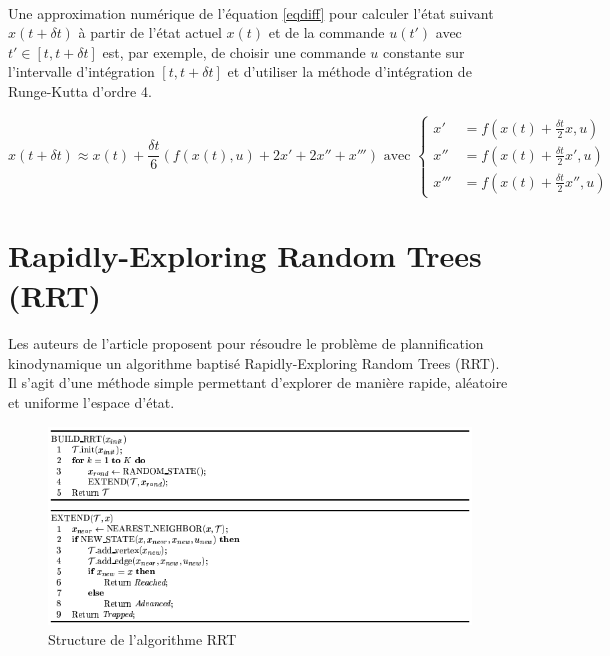 \documentclass[12pt]{article}
\begin{document}
\paragraph{}
Une approximation numérique de l'équation \eqref{eqdiff} pour calculer l'état suivant $x(t+\delta t)$ à partir de l'état actuel $x(t)$ et de la commande $u(t')$ avec $t' \in [t, t+\delta t]$ est, par exemple, de choisir une commande $u$ constante sur l'intervalle d'intégration $[t, t+\delta t]$ et d'utiliser la méthode d'intégration de Runge-Kutta d'ordre 4.

$$
x(t+\delta t) \approx x(t)+\frac{\delta t}{6}(f(x(t),u)+2x'+2x''+x''') \text{ avec } \left\{
\begin{matrix}
x' &= f(x(t)+\frac{\delta t}{2}x,u)\\
x'' &= f(x(t)+\frac{\delta t}{2}x',u)\\
x''' &= f(x(t)+\frac{\delta t}{2}x'',u)
\end{matrix}
\right.
$$


\section{Rapidly-Exploring Random Trees (RRT)}

\paragraph{}
Les auteurs de l'article proposent pour résoudre le problème de plannification kinodynamique un algorithme baptisé \og Rapidly-Exploring Random Trees \fg{} (RRT). Il s'agit d'une méthode simple permettant d'explorer de manière rapide, aléatoire et uniforme l'espace d'état.

\begin{figure}[H]
\centering
\includegraphics[scale=0.65]{img/RRTalgo.png}
\caption{Structure de l'algorithme RRT}
\label{RRTalgo}
\end{figure}
\end{document}
